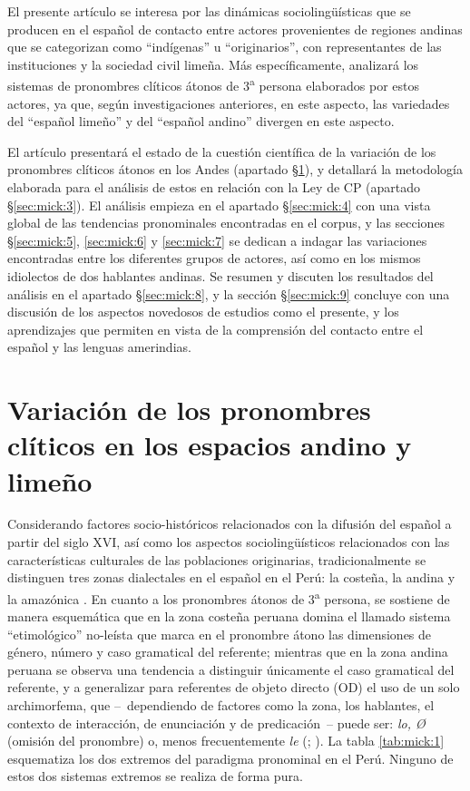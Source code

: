 \documentclass[output=paper]{../langscibook}
\begin{document}
El presente artículo se interesa por las dinámicas sociolingüísticas que se producen en el español de contacto entre actores provenientes de regiones andinas que se categorizan como “indígenas” u “originarios”, con representantes de las instituciones y la sociedad civil limeña. Más específicamente, analizará los sistemas de pronombres clíticos átonos de 3\textsuperscript{a} persona elaborados por estos actores, ya que, según investigaciones anteriores, en este aspecto, las variedades del “español limeño” y del “español andino” divergen en este aspecto. 

El artículo presentará el estado de la cuestión científica de la variación de los pronombres clíticos átonos en los Andes (apartado §\ref{sec:mick:2}), y detallará la metodología elaborada para el análisis de estos en relación con la Ley de CP (apartado §\ref{sec:mick:3}). El análisis empieza en el apartado §\ref{sec:mick:4} con una vista global de las tendencias pronominales encontradas en el corpus, y las secciones §\ref{sec:mick:5}, \ref{sec:mick:6} y \ref{sec:mick:7} se dedican a indagar las variaciones encontradas entre los diferentes grupos de actores, así como en los mismos idiolectos de dos hablantes andinas. Se resumen y discuten los resultados del análisis en el apartado §\ref{sec:mick:8}, y la sección §\ref{sec:mick:9} concluye con una discusión de los aspectos novedosos de estudios como el presente, y los aprendizajes que permiten en vista de la comprensión del contacto entre el español y las lenguas amerindias.

\section{Variación de los pronombres clíticos en los espacios andino y limeño}\label{sec:mick:2}

Considerando factores socio-históricos relacionados con la difusión del español a partir del siglo XVI, así como los aspectos sociolingüísticos relacionados con las características culturales de las poblaciones originarias, tradicionalmente se distinguen tres zonas dialectales en el español en el Perú: la costeña, la andina y la amazónica \citep{Caravedo1992}. En cuanto a los pronombres átonos de 3\textsuperscript{a} persona, se sostiene de manera esquemática que en la zona costeña peruana domina el llamado sistema “etimológico” no-leísta que marca en el pronombre átono las dimensiones de género, número y caso gramatical del referente; mientras que en la zona andina peruana se observa una tendencia a distinguir únicamente el caso gramatical del referente, y a generalizar para referentes de objeto directo (OD) el uso de un solo archimorfema, que – dependiendo de factores como la zona, los hablantes, el contexto de interacción, de enunciación y de predicación – puede ser: \textit{lo, Ø} (omisión del pronombre) o, menos frecuentemente \textit{le} (\citealt{Caravedo1992}; \citealt{KleeLynch2009book}). La tabla \ref{tab:mick:1} esquematiza los dos extremos del paradigma pronominal en el Perú. Ninguno de estos dos sistemas extremos se realiza de forma pura.
\end{document}
